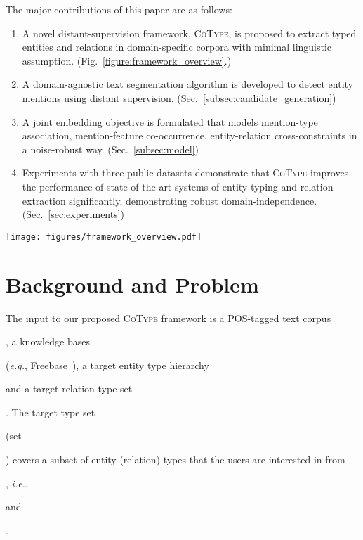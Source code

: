 \documentclass[letterpaper]{sig-alternate-2013}
\def\ie{{\sl i.e.}}
\def\eg{{\sl e.g.}}
\begin{document}
The major contributions of this paper are as follows:
\begin{enumerate}[leftmargin=12pt]\itemsep+0.1cm
\item A novel distant-supervision framework, \textsc{CoType}, is proposed to extract typed entities and relations in domain-specific corpora with minimal linguistic assumption. (Fig.~\ref{figure:framework_overview}.)
\item A domain-agnostic text segmentation algorithm is developed to detect entity mentions using distant supervision. (Sec.~\ref{subsec:candidate_generation}) 
\item A joint embedding objective is formulated that models mention-type association, mention-feature co-occurrence, entity-relation cross-constraints in a noise-robust way. (Sec.~\ref{subsec:model}) 
\item Experiments with three public datasets demonstrate that \textsc{CoType} improves the performance of state-of-the-art systems of entity typing and relation extraction significantly, demonstrating robust domain-independence.(Sec.~\ref{sec:experiments})
\end{enumerate}



\begin{figure*}
\centering
\vspace{-0.3cm}
\texttt{[image: figures/framework\_overview.pdf]}
\caption{Framework Overview of \textsc{CoType}.}
\label{figure:framework_overview}
\end{figure*}

\section{Background and Problem}
\label{sec:problem}


The input to our proposed \textsc{CoType} framework is a POS-tagged text corpus \begin{small}\end{small}, a knowledge bases \begin{small}\end{small} (\eg, Freebase~\cite{bollacker2008freebase}), a target entity type hierarchy \begin{small}\end{small} and a target relation type set \begin{small}\end{small}.  The target type set \begin{small}\end{small} (set \begin{small}\end{small}) covers a subset of entity (relation) types that the users are interested in from \begin{small}\end{small}, \ie, \begin{small}\end{small} and \begin{small}\end{small}.
\end{document}
